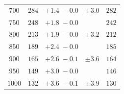 \begin{table}
\begin{tabular}{ccccc}
$700 $&$  284  $&$ +1.4 \; -\!0.0 $&$ \pm 3.0  $&$  282  $ \\
$750 $&$  248  $&$ +1.8 \; -\!0.0 $&$          $&$  242  $ \\
$800 $&$  213  $&$ +1.9 \; -\!0.0 $&$ \pm 3.2  $&$  212  $ \\
$850 $&$  189  $&$ +2.4 \; -\!0.0 $&$          $&$  185  $ \\
$900 $&$  165  $&$ +2.6 \; -\!0.1 $&$ \pm 3.6  $&$  164  $ \\
$950 $&$  149  $&$ +3.0 \; -\!0.0 $&$          $&$  146  $ \\
$1000$&$  132  $&$ +3.6 \; -\!0.1 $&$ \pm 3.9  $&$  130  $ \\
\hline
\end{tabular}
\label{tab:yesEWnoSch14TeV}
\end{table}
                  
